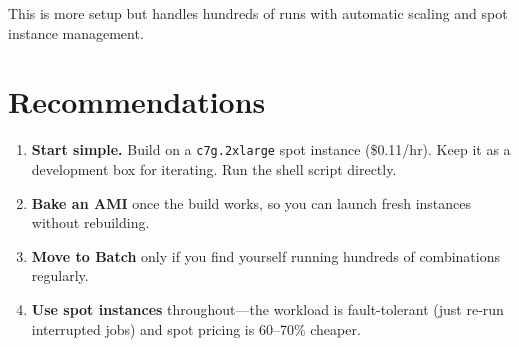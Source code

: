 \documentclass[11pt]{article}
\begin{document}
This is more setup but handles hundreds of runs with automatic scaling
and spot instance management.

\section{Recommendations}

\begin{enumerate}
\item \textbf{Start simple.}  Build on a \texttt{c7g.2xlarge} spot instance
  (\$0.11/hr).  Keep it as a development box for iterating.  Run the
  shell script directly.
\item \textbf{Bake an AMI} once the build works, so you can launch fresh
  instances without rebuilding.
\item \textbf{Move to Batch} only if you find yourself running hundreds of
  combinations regularly.
\item \textbf{Use spot instances} throughout---the workload is fault-tolerant
  (just re-run interrupted jobs) and spot pricing is 60--70\% cheaper.
\end{enumerate}
\end{document}
